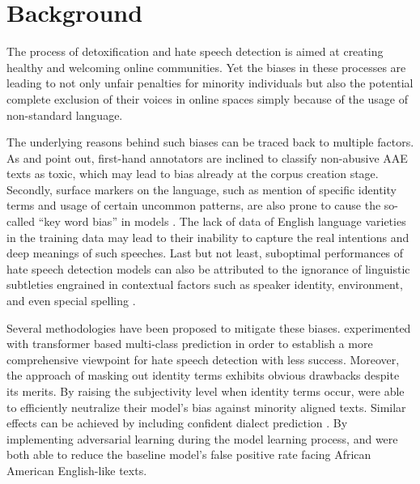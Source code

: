 \documentclass[11pt]{article}
\begin{document}
\section{Background}

The process of detoxification and hate speech detection is aimed at creating healthy and welcoming online communities. Yet the biases in these processes are leading to not only unfair penalties for minority individuals \citep{davidson-etal-2019-racial} but also the potential complete exclusion of their voices in online spaces \citep{blodgett-2017-racial} simply because of the usage of non-standard language.

The underlying reasons behind such biases can be traced back to multiple factors. As \citet{xia-etal-2020-demoting} and \citet{sap-etal-2022-annotators} point out, first-hand annotators are inclined to classify non-abusive AAE texts as toxic, which may lead to bias already at the corpus creation stage. Secondly, surface markers on the language, such as mention of specific identity terms and usage of certain uncommon patterns, are also prone to cause the so-called \enquote{key word bias} in models \citep{resende-2024-comprehensive, schafer-2023-bias}. The lack of data of English language varieties in the training data may lead to their inability to capture the real intentions and deep meanings of such speeches. Last but not least, suboptimal performances of hate speech detection models can also be attributed to the ignorance of linguistic subtleties engrained in contextual factors such as speaker identity, environment, and even special spelling \citep{davidson-etal-2019-racial}.

Several methodologies have been proposed to mitigate these biases. \citet{schafer-2023-bias} experimented with transformer based multi-class prediction in order to establish a more comprehensive viewpoint for hate speech detection with less success. Moreover, the approach of masking out identity terms exhibits obvious drawbacks despite its merits. By raising the subjectivity level when identity terms occur, \citep{zhao-2022-subjectivity} were able to efficiently neutralize their model’s bias against minority aligned texts. Similar effects can be achieved by including confident dialect prediction \citep{ball-2021-differential}. By implementing adversarial learning during the model learning process, \citet{xia-etal-2020-demoting} and \citep{okpala-2022-aaebert} were both able to reduce the baseline model’s false positive rate facing African American English-like texts.
\end{document}
